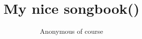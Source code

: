 \title{My nice songbook()}
\author{Anonymous of course}
\newcommand{\introduction}{
  This is our nice songbook.

  You can obtain it at github.
}

